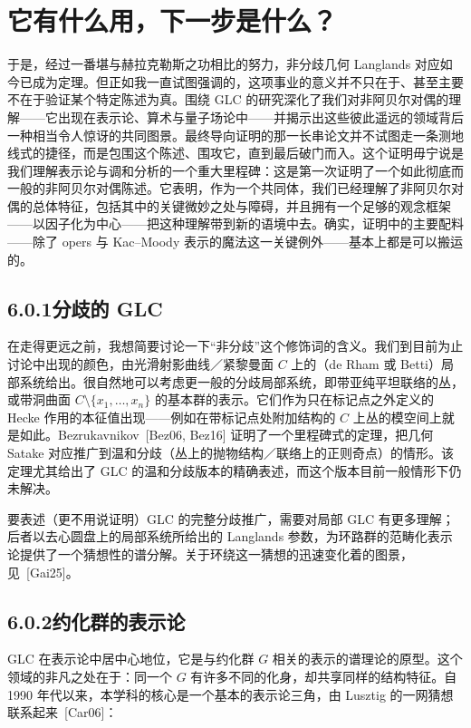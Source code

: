 \section{它有什么用，下一步是什么？}\label{sec:6}

于是，经过一番堪与赫拉克勒斯之功相比的努力，非分歧几何 Langlands 对应如今已成为定理。但正如我一直试图强调的，这项事业的意义并不只在于、甚至主要不在于验证某个特定陈述为真。围绕 GLC 的研究深化了我们对非阿贝尔对偶的理解——它出现在表示论、算术与量子场论中——并揭示出这些彼此遥远的领域背后一种相当令人惊讶的共同图景。最终导向证明的那一长串论文并不试图走一条测地线式的捷径，而是包围这个陈述、围攻它，直到最后破门而入。这个证明毋宁说是我们理解表示论与调和分析的一个重大里程碑：这是第一次证明了一个如此彻底而一般的非阿贝尔对偶陈述。它表明，作为一个共同体，我们已经理解了非阿贝尔对偶的总体特征，包括其中的关键微妙之处与障碍，并且拥有一个足够的观念框架——以因子化为中心——把这种理解带到新的语境中去。确实，证明中的主要配料——除了 opers 与 Kac–Moody 表示的魔法这一关键例外——基本上都是可以搬运的。

\subsection*{6.0.1\quad 分歧的 GLC}

在走得更远之前，我想简要讨论一下“非分歧”这个修饰词的含义。我们到目前为止讨论中出现的颜色，由光滑射影曲线／紧黎曼面 $C$ 上的（de Rham 或 Betti）局部系统给出。很自然地可以考虑更一般的分歧局部系统，即带亚纯平坦联络的丛，或带洞曲面 $C\setminus\{x_{1},\dots,x_{n}\}$ 的基本群的表示。它们作为只在标记点之外定义的 Hecke 作用的本征值出现——例如在带标记点处附加结构的 $C$ 上丛的模空间上就是如此。Bezrukavnikov~[Bez06, Bez16] 证明了一个里程碑式的定理，把几何 Satake 对应推广到温和分歧（丛上的抛物结构／联络上的正则奇点）的情形。该定理尤其给出了 GLC 的温和分歧版本的精确表述，而这个版本目前一般情形下仍未解决。

要表述（更不用说证明）GLC 的完整分歧推广，需要对局部 GLC 有更多理解；后者以去心圆盘上的局部系统所给出的 Langlands 参数，为环路群的范畴化表示论提供了一个猜想性的谱分解。关于环绕这一猜想的迅速变化着的图景，见~[Gai25]。

\subsection*{6.0.2\quad 约化群的表示论}

GLC 在表示论中居中心地位，它是与约化群 $G$ 相关的表示的谱理论的原型。这个领域的非凡之处在于：同一个 $G$ 有许多不同的化身，却共享同样的结构特征。自 1990 年代以来，本学科的核心是一个基本的表示论三角，由 Lusztig 的一网猜想联系起来~[Car06]：

